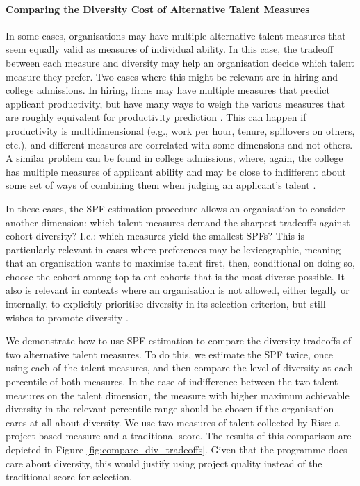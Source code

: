 \paragraph{Comparing the Diversity Cost of Alternative Talent Measures} In some cases, organisations may have multiple alternative talent measures that seem equally valid as measures of individual ability. In this case, the tradeoff between each measure and diversity may help an organisation decide which talent measure they prefer.  Two cases where this might be relevant are in hiring and college admissions. In hiring, firms may have multiple measures that predict applicant productivity, but have many ways to weigh the various measures that are roughly equivalent for productivity prediction \cite{hartigan_fairness_1989}. This can happen if productivity is multidimensional (e.g., work per hour, tenure, spillovers on others, etc.), and different measures are correlated with some dimensions and not others. A similar problem can be found in college admissions, where, again, the college has multiple measures of applicant ability and may be close to indifferent about some set of ways of combining them when judging an applicant's talent \cite{tam2002new}. 

In these cases, the SPF estimation procedure allows an organisation to consider another dimension: which talent measures demand the sharpest tradeoffs against cohort diversity? I.e.: which measures yield the smallest SPFs? This is particularly relevant in cases where preferences may be lexicographic, meaning that an organisation wants to maximise talent first, then, conditional on doing so, choose the cohort among top talent cohorts that is the most diverse possible. It also is relevant in contexts where an organisation is not allowed, either legally or internally, to explicitly prioritise diversity in its selection criterion, but still wishes to promote diversity \cite{Bleemer_2023}. 

We demonstrate how to use SPF estimation to compare the diversity tradeoffs of two alternative talent measures. To do this, we estimate the SPF twice, once using each of the talent measures, and then compare the level of diversity at each percentile of both measures. In the case of indifference between the two talent measures on the talent dimension, the measure with higher maximum achievable diversity in the relevant percentile range should be chosen if the organisation cares at all about diversity. We use two measures of talent collected by Rise: a project-based measure and a traditional score. The results of this comparison are depicted in Figure \ref{fig:compare_div_tradeoffs}. Given that the programme does care about diversity, this would justify using project quality instead of the traditional score for selection. 

